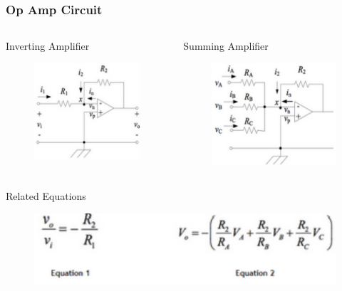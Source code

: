 \documentclass{beamer}
\begin{document}
\begin{frame}
	\frametitle{Op Amp Circuit}
	\begin{columns}[T]
		\begin{column}{0.5\textwidth}
			\begin{block}{Inverting Amplifier}
				\begin{figure}
					\centering 
					\includegraphics[scale=.7]{figures/opamp1-1.pdf} 
				\end{figure}
			\end{block}
		\end{column}		
		\begin{column}{0.5\textwidth}
			\begin{block}{Summing Amplifier}
				\begin{figure}
					\centering
					\includegraphics[scale=.7]{figures/opamp2-2.pdf}
				\end{figure}
			\end{block}	
		\end{column}
	\end{columns}
	\begin{block}{Related Equations}
		\begin{figure}
			\centering
			\includegraphics[scale=.6]{figures/opamp3-3.pdf}
		\end{figure}
	\end{block}								
\end{frame}
\end{document}
